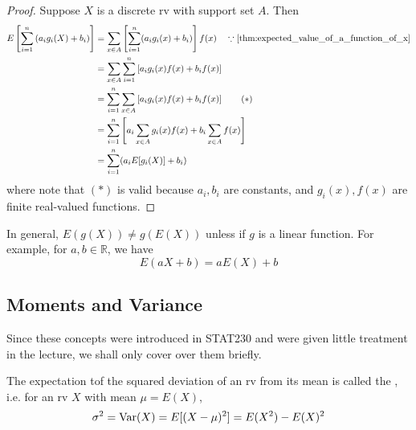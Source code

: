 \documentclass[notoc,notitlepage]{tufte-book}
\begin{document}
\begin{proof}
  Suppose $X$ is a discrete rv with support set $A$. Then
  \begin{align*}
    E \left[ \sum_{i = 1}^{n} \left( a_i g_i(X) + b_i \right) \right]
      &= \sum_{x \in A} \left[ \sum_{i = 1}^{n} ( a_i g_i(x) + b_i ) \right] f(x) \quad \because \cref{thm:expected_value_of_a_function_of_x} \\
      &= \sum_{x \in A} \sum_{i = 1}^{n} \left[ a_i g_i(x) f(x) + b_i f(x) \right] \\
      &= \sum_{i = 1}^{n} \sum_{x \in A} \left[ a_i g_i(x) f(x) + b_i f(x) \right] \qquad (*) \\
      &= \sum_{i = 1}^{n} \left[ a_i \sum_{x \in A} g_i(x) f(x) + b_i \sum_{x \in A} f(x) \right] \\
      &= \sum_{i = 1}^{n} (a_i E[g_i(X)] + b_i)
  \end{align*}
  where note that $(*)$ is valid because $a_i, b_i$ are constants, and $g_i(x), f(x)$ are finite real-valued functions.
\end{proof}

\begin{note}
  In general, $E(g(X)) \neq g(E(X))$ unless if $g$ is a linear function. For example, for $a, b \in \mathbb{R}$, we have
  \begin{equation*}
    E(aX + b) = aE(X) + b
  \end{equation*}
\end{note}


\subsection{Moments and Variance}%
\label{sub:moments_and_variance}

Since these concepts were introduced in STAT230 and were given little treatment in the lecture, we shall only cover over them briefly.

\begin{defn}[Variance]
\label{defn:variance}
  The expectation tof the squared deviation of an rv from its mean is called the , i.e. for an rv $X$ with mean $\mu = E(X)$,
  \begin{equation*}
    \sigma^2 = \operatorname{Var}(X) = E[ (X - \mu)^2 ] = E(X^2) - E(X)^2
  \end{equation*}
\end{defn}
\end{document}

